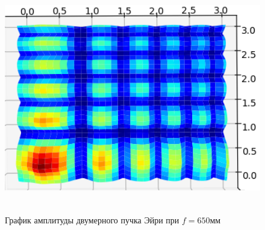 {    \vspace{0.6cm}

    \begin{figure}[H]
        \centering
        \includegraphics[height = 10cm]{plots/ai3d}
        \vspace{0.4cm}
        \caption{График амплитуды двумерного пучка Эйри при $f = 650$мм}
        \label{ai3d}
    \end{figure}
    }\label{sec:моделирование-трехмерной-картины-распространения-пучков}


    \newpage
    \titleformat{\section}{\bfseries\centering}{\thesection}{0.5em}{\MakeUppercase}

